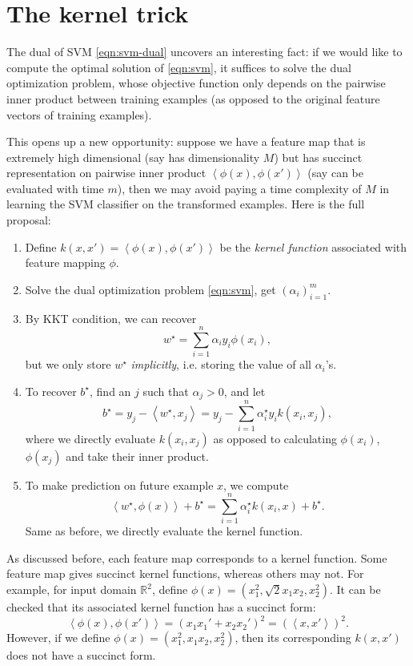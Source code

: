 \documentclass{article}
\newcommand{\RR}{\mathbb{R}} %
\newcommand{\inner}[2]{\left\langle #1,#2 \right\rangle}
\begin{document}
\section{The kernel trick}
The dual of SVM \eqref{eqn:svm-dual} uncovers an interesting fact: if we would like to compute the optimal solution of \eqref{eqn:svm}, it suffices to solve the dual optimization problem, whose
objective function only depends on the pairwise inner product between training examples (as opposed to the original feature vectors of training examples).

This opens up a new opportunity: suppose we have a feature map that is extremely high dimensional (say has dimensionality $M$) but has succinct representation on pairwise inner product $\inner{\phi(x)}{\phi(x')}$ (say can be evaluated with time $m$), then we may avoid paying a time complexity of $M$ in learning the SVM classifier on the transformed examples.
Here is the full proposal:
\begin{enumerate}
\item Define $k(x,x') = \inner{\phi(x)}{\phi(x')}$ be the {\em kernel function} associated with feature mapping $\phi$.
\item Solve the dual optimization problem \eqref{eqn:svm}, get $(\alpha_i)_{i=1}^m$.
\item By KKT condition, we can recover
\[ w^\star = \sum_{i=1}^n \alpha_i y_i \phi(x_i), \]
but we only store $w^\star$ {\em implicitly}, i.e. storing the value of all $\alpha_i$'s.
\item To recover $b^\star$, find an $j$ such that $\alpha_j > 0$, and let
\[ b^\star = y_j - \inner{w^\star}{x_j} = y_j - \sum_{i=1}^n \alpha_i^\star y_i k(x_i, x_j), \]
where we directly evaluate $k(x_i, x_j)$ as opposed to calculating $\phi(x_i)$, $\phi(x_j)$ and take their inner product.
\item To make prediction on future example $x$, we compute
\[ \inner{w^\star}{\phi(x)} + b^\star = \sum_{i=1}^n \alpha_i^\star k(x_i, x) + b^\star. \]
Same as before, we directly evaluate the kernel function.
\end{enumerate}

As discussed before, each feature map corresponds to a kernel function. Some feature map gives succinct kernel functions, whereas others may not. For example, for input domain $\RR^2$, define $\phi(x) = (x_1^2, \sqrt{2} x_1 x_2, x_2^2)$. It can be checked that its associated kernel function has a succinct form:
\[ \inner{\phi(x)}{\phi(x')} = (x_1x_1' + x_2x_2')^2 = (\inner{x}{x'})^2. \]
However, if we define $\phi(x) = (x_1^2, x_1 x_2, x_2^2)$, then its corresponding
$k(x,x')$ does not have a succinct form.
\end{document}

